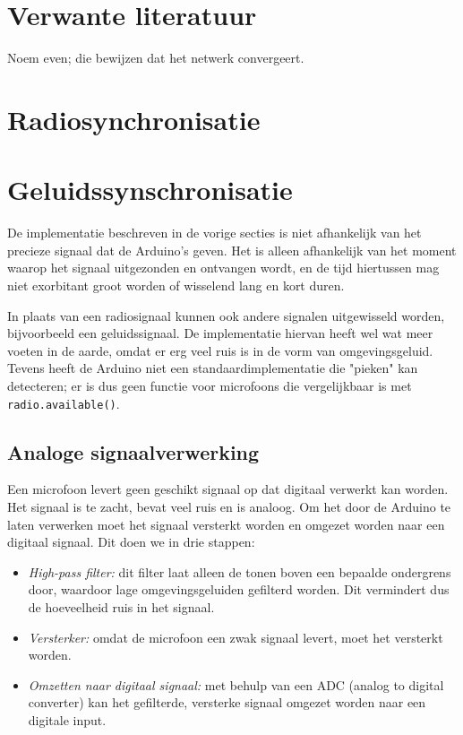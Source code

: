 \documentclass[a4paper,10pt]{article}
\begin{document}
\section{Verwante literatuur}
Noem \cite{lucarelli2004decentralized} even; die bewijzen dat het netwerk convergeert.

\section{Radiosynchronisatie}\label{sec:radiosync}

\section{Geluidssynschronisatie}\label{sec:geluidssec}
De implementatie beschreven in de vorige secties is niet afhankelijk van het precieze signaal dat de Arduino's geven. Het is alleen afhankelijk van het moment waarop het signaal uitgezonden en ontvangen wordt, en de tijd hiertussen mag niet exorbitant groot worden of wisselend lang en kort duren.

In plaats van een radiosignaal kunnen ook andere signalen uitgewisseld worden, bijvoorbeeld een geluidssignaal. De implementatie hiervan heeft wel wat meer voeten in de aarde, omdat er erg veel ruis is in de vorm van omgevingsgeluid. Tevens heeft de Arduino niet een standaardimplementatie die "pieken" kan detecteren; er is dus geen functie voor microfoons die vergelijkbaar is met \texttt{radio.available()}.

\subsection{Analoge signaalverwerking}
Een microfoon levert geen geschikt signaal op dat digitaal verwerkt kan worden. Het signaal is te zacht, bevat veel ruis en is analoog. Om het door de Arduino te laten verwerken moet het signaal versterkt worden en omgezet worden naar een digitaal signaal. Dit doen we in drie stappen:
\begin{itemize}
	\item \textit{High-pass filter:} dit filter laat alleen de tonen boven een bepaalde ondergrens door, waardoor lage omgevingsgeluiden gefilterd worden. Dit vermindert dus de hoeveelheid ruis in het signaal.
	\item \textit{Versterker:} omdat de microfoon een zwak signaal levert, moet het versterkt worden.
	\item \textit{Omzetten naar digitaal signaal:} met behulp van een ADC (analog to digital converter) kan het gefilterde, versterke signaal omgezet worden naar een digitale input.
\end{itemize}
\end{document}
